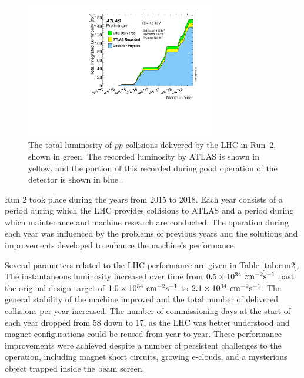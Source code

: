\begin{figure}[h!]
\captionsetup[subfigure]{position=b}
\centering
\includegraphics[width=0.75\textwidth]{figures/experiment/lhc/run2Lumi.pdf}
\caption{The total luminosity of $pp$ collisions delivered by the LHC in Run~2, shown in green. The recorded luminosity by ATLAS is shown in yellow, and the portion of this recorded during good operation of the detector is shown in blue  \cite{ATLAS-CONF-2019-021}.}
\label{fig:run2Lumi}
\end{figure}

Run 2 took place during the years from 2015 to 2018.
Each year consists of a period during which the LHC provides collisions to ATLAS and a period during which maintenance and machine research are conducted.
The operation during each year was influenced by the problems of previous years and the solutions and improvements developed to enhance the machine's performance.

Several parameters related to the LHC performance are given in Table \ref{tab:run2}.
The instantaneous luminosity increased over time from $0.5\times10^{34}~\text{cm}^{-2}\text{s}^{-1}$ past the original design target of $1.0\times10^{34}~\text{cm}^{-2}\text{s}^{-1}$ to $2.1\times10^{34}~\text{cm}^{-2}\text{s}^{-1}$.
The general stability of the machine improved and the total number of delivered collisions per year increased.
The number of commissioning days at the start of each year dropped from 58 down to 17, as the LHC was better understood and magnet configurations could be reused from year to year.
These performance improvements were achieved despite a number of persistent challenges to the operation, including magnet short circuits, growing e-clouds, and a mysterious object trapped inside the beam screen.

